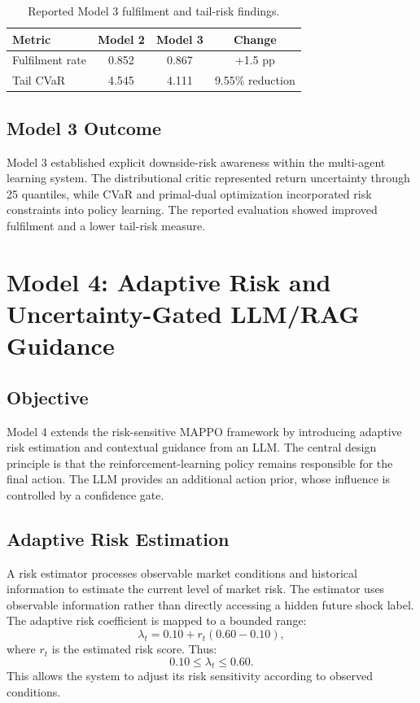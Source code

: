 \documentclass[conference]{IEEEtran}
\begin{document}
\begin{table}[!t]
\centering
\caption{Reported Model 3 fulfilment and tail-risk findings.}
\label{tab:m3}
\small
\begin{tabular}{lccc}
\toprule
\textbf{Metric} & \textbf{Model 2} & \textbf{Model 3} & \textbf{Change} \\
\midrule
Fulfilment rate & 0.852 & 0.867 & +1.5 pp \\
Tail CVaR       & 4.545 & 4.111 & 9.55\% reduction \\
\bottomrule
\end{tabular}
\end{table}

\subsection{Model 3 Outcome}
Model 3 established explicit downside-risk awareness within the multi-agent learning system. The distributional critic represented return uncertainty through 25 quantiles, while CVaR and primal-dual optimization incorporated risk constraints into policy learning. The reported evaluation showed improved fulfilment and a lower tail-risk measure.

\section{Model 4: Adaptive Risk and Uncertainty-Gated LLM/RAG Guidance}

\subsection{Objective}
Model 4 extends the risk-sensitive MAPPO framework by introducing adaptive risk estimation and contextual guidance from an LLM. The central design principle is that the reinforcement-learning policy remains responsible for the final action. The LLM provides an additional action prior, whose influence is controlled by a confidence gate.

\subsection{Adaptive Risk Estimation}
A risk estimator processes observable market conditions and historical information to estimate the current level of market risk. The estimator uses observable information rather than directly accessing a hidden future shock label. The adaptive risk coefficient is mapped to a bounded range:
\begin{equation}
  \lambda_t = 0.10 + r_t(0.60 - 0.10),
\end{equation}
where $r_t$ is the estimated risk score. Thus:
\begin{equation}
  0.10 \le \lambda_t \le 0.60.
\end{equation}
This allows the system to adjust its risk sensitivity according to observed conditions.
\end{document}
